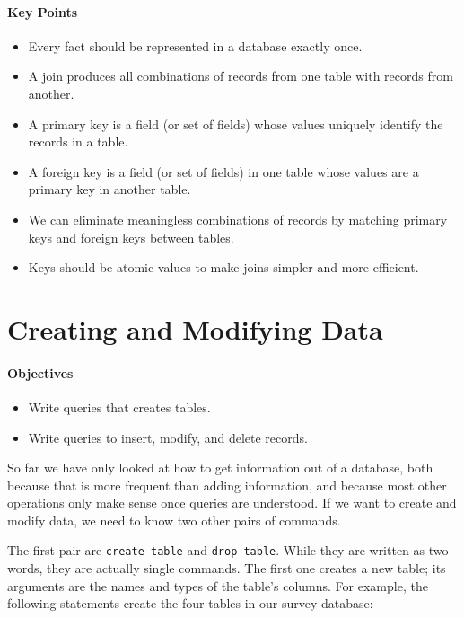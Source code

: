 \documentclass[]{book}
\begin{document}
\mbox{}\paragraph{Key Points}

\begin{itemize}
\item
  Every fact should be represented in a database exactly once.
\item
  A join produces all combinations of records from one table with
  records from another.
\item
  A primary key is a field (or set of fields) whose values uniquely
  identify the records in a table.
\item
  A foreign key is a field (or set of fields) in one table whose values
  are a primary key in another table.
\item
  We can eliminate meaningless combinations of records by matching
  primary keys and foreign keys between tables.
\item
  Keys should be atomic values to make joins simpler and more efficient.
\end{itemize}

\section{Creating and Modifying Data}

\mbox{}\paragraph{Objectives}

\begin{itemize}
\item
  Write queries that creates tables.
\item
  Write queries to insert, modify, and delete records.
\end{itemize}

So far we have only looked at how to get information out of a database,
both because that is more frequent than adding information, and because
most other operations only make sense once queries are understood. If we
want to create and modify data, we need to know two other pairs of
commands.

The first pair are \texttt{create table} and \texttt{drop table}. While
they are written as two words, they are actually single commands. The
first one creates a new table; its arguments are the names and types of
the table's columns. For example, the following statements create the
four tables in our survey database:
\end{document}
